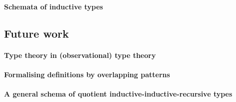 \documentclass[a4paper,UKenglish,numberwithinsect,cleveref,thm-restate]{lipics-v2021}
\begin{document}
\paragraph*{Schemata of inductive types}
\cite{Kaposi2019}


\subsection{Future work}
\paragraph*{Type theory in (observational) type theory}
\paragraph*{Formalising definitions by overlapping patterns}
\paragraph*{A general schema of quotient inductive-inductive-recursive types}


\appendix
\end{document}
